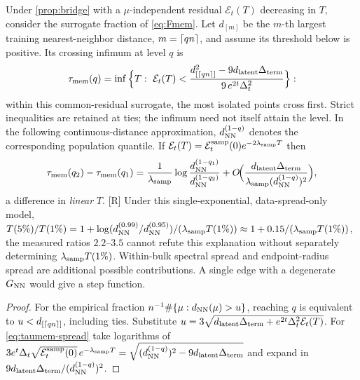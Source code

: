 \begin{corollary}\label{cor:taumem-fraction}
Under \cref{prop:bridge} with a $\mu$-independent residual $\mathcal E_t(T)$ decreasing in $T$, consider the surrogate fraction of \eqref{eq:Fmem}. Let $d_{[m]}$ be the $m$-th largest training nearest-neighbor distance, $m=\lceil qn\rceil$, and assume its threshold below is positive. Its crossing infimum at level $q$ is
\begin{equation}\label{eq:taumem-q}
 \tau_{\mathrm{mem}}(q)=\inf\Big\{T:\ \mathcal E_t(T)< \frac{d_{[\lceil qn\rceil]}^2-9d_{\mathrm{latent}}\Delta_{\rm term}}{9\,e^{2t}\Delta_t^{2}}\Big\}:
\end{equation}
within this common-residual surrogate, the most isolated points cross first. Strict inequalities are retained at ties; the infimum need not itself attain the level. In the following continuous-distance approximation, $d_{\rm NN}^{(1-q)}$ denotes the corresponding population quantile. If $\mathcal E_t(T)=\mathcal E^{\rm samp}_t(0)e^{-2\lambda_{\rm samp}T}$ then
\begin{equation}\label{eq:taumem-spread}
 \tau_{\mathrm{mem}}(q_2)-\tau_{\mathrm{mem}}(q_1)=\frac{1}{\lambda_{\rm samp}}\log\frac{d_{\rm NN}^{(1-q_1)}}{d_{\rm NN}^{(1-q_2)}}+O\!\Big(\frac{d_{\mathrm{latent}}\Delta_{\rm term}}{\lambda_{\rm samp}(d^{(1-q)}_{\rm NN})^2}\Big),
\end{equation}
a difference in \emph{linear} $T$. [R] Under this single-exponential, data-spread-only model, $T(5\%)/T(1\%)=1+\log(d^{(0.99)}_{\rm NN}/d^{(0.95)}_{\rm NN})/(\lambda_{\rm samp}T(1\%))\approx1+0.15/(\lambda_{\rm samp}T(1\%))$, the measured ratios $2.2$--$3.5$ cannot refute this explanation without separately determining $\lambda_{\rm samp}T(1\%)$. Within-bulk spectral spread and endpoint-radius spread are additional possible contributions. A single edge with a degenerate $G_{\rm NN}$ would give a step function.
\end{corollary}
\begin{proof}
For the empirical fraction $n^{-1}\#\{\mu:d_{\rm NN}(\mu)>u\}$, reaching $q$ is equivalent to $u<d_{[\lceil qn\rceil]}$, including ties. Substitute $u=3\sqrt{d_{\mathrm{latent}}\Delta_{\rm term}+e^{2t}\Delta_t^2\mathcal E_t(T)}$. For \eqref{eq:taumem-spread} take logarithms of $3e^{t}\Delta_t\sqrt{\mathcal E^{\rm samp}_t(0)}\,e^{-\lambda_{\rm samp}T}=\sqrt{(d^{(1-q)}_{\rm NN})^2-9d_{\mathrm{latent}}\Delta_{\rm term}}$ and expand in $9d_{\mathrm{latent}}\Delta_{\rm term}/(d^{(1-q)}_{\rm NN})^2$.
\end{proof}

